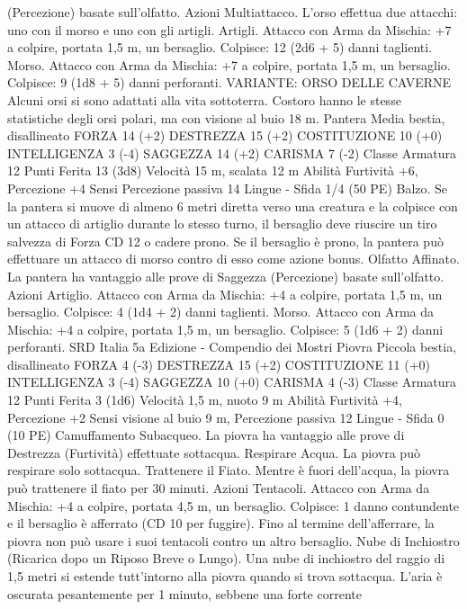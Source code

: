 \begin{multicols}{2}
(Percezione) basate sull’olfatto.
Azioni
Multiattacco. L’orso effettua due attacchi: uno con il morso e
uno con gli artigli.
Artigli. Attacco con Arma da Mischia: +7 a colpire, portata 1,5
m, un bersaglio.
Colpisce: 12 (2d6 + 5) danni taglienti.
Morso. Attacco con Arma da Mischia: +7 a colpire, portata 1,5
m, un bersaglio.
Colpisce: 9 (1d8 + 5) danni perforanti.
VARIANTE: ORSO DELLE CAVERNE
Alcuni orsi si sono adattati alla vita sottoterra. Costoro hanno le
stesse statistiche degli orsi polari, ma con visione al buio 18 m.
Pantera
Media bestia, disallineato
FORZA 14 (+2)
DESTREZZA 15 (+2)
COSTITUZIONE 10 (+0)
INTELLIGENZA 3 (-4)
SAGGEZZA 14 (+2)
CARISMA 7 (-2)
Classe Armatura 12
Punti Ferita 13 (3d8)
Velocità 15 m, scalata 12 m
Abilità Furtività +6, Percezione +4
Sensi Percezione passiva 14
Lingue -
Sfida 1/4 (50 PE)
Balzo. Se la pantera si muove di almeno 6 metri diretta verso una
creatura e la colpisce con un attacco di artiglio durante lo stesso
turno, il bersaglio deve riuscire un tiro salvezza di Forza CD 12 o
cadere prono. Se il bersaglio è prono, la pantera può effettuare un
attacco di morso contro di esso come azione bonus.
Olfatto Affinato. La pantera ha vantaggio alle prove di Saggezza
(Percezione) basate sull’olfatto.
Azioni
Artiglio. Attacco con Arma da Mischia: +4 a colpire, portata 1,5
m, un bersaglio.
Colpisce: 4 (1d4 + 2) danni taglienti.
Morso. Attacco con Arma da Mischia: +4 a colpire, portata 1,5
m, un bersaglio.
Colpisce: 5 (1d6 + 2) danni perforanti.
SRD Italia 5a Edizione - Compendio dei Mostri
Piovra
Piccola bestia, disallineato
FORZA 4 (-3)
DESTREZZA 15 (+2)
COSTITUZIONE 11 (+0)
INTELLIGENZA 3 (-4)
SAGGEZZA 10 (+0)
CARISMA 4 (-3)
Classe Armatura 12
Punti Ferita 3 (1d6)
Velocità 1,5 m, nuoto 9 m
Abilità Furtività +4, Percezione +2
Sensi visione al buio 9 m, Percezione passiva 12
Lingue -
Sfida 0 (10 PE)
Camuffamento Subacqueo. La piovra ha vantaggio alle prove di
Destrezza (Furtività) effettuate sottacqua.
Respirare Acqua. La piovra può respirare solo sottacqua.
Trattenere il Fiato. Mentre è fuori dell’acqua, la piovra può
trattenere il fiato per 30 minuti.
Azioni
Tentacoli. Attacco con Arma da Mischia: +4 a colpire, portata
4,5 m, un bersaglio.
Colpisce: 1 danno contundente e il bersaglio è afferrato (CD 10
per fuggire). Fino al termine dell’afferrare, la piovra non può
usare i suoi tentacoli contro un altro bersaglio.
Nube di Inchiostro (Ricarica dopo un Riposo Breve o Lungo).
Una nube di inchiostro del raggio di 1,5 metri si estende
tutt’intorno alla piovra quando si trova sottacqua. L’aria è
oscurata pesantemente per 1 minuto, sebbene una forte corrente

\end{multicols}
